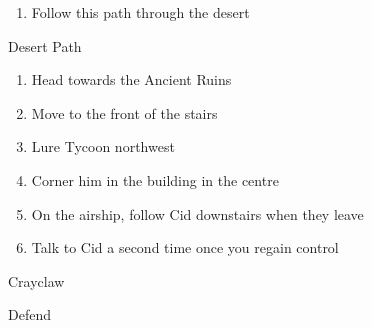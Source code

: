 \begin{paracol}{2}
\switchcolumnTwice[*]
\begin{enumerate}[resume]
    \item Follow this path through the desert
\end{enumerate}

\switchcolumn
\begin{misc}{Desert Path}
\end{misc}

\switchcolumn
\resume
\begin{enumerate}[resume]
    \item Head towards the Ancient Ruins
    \item Move to the front of the stairs
    \item Lure Tycoon northwest
    \item Corner him in the building in the centre
    \item On the airship, follow Cid downstairs when they leave
    \item Talk to Cid a second time once you regain control
\end{enumerate}

\begin{boss}{Crayclaw}
    \varwb
    \begin{round}{1}
        \faris \leftCommand{\throw} \then \thunderScroll
        \bartz Defend
        \lenna \leftCommand{\release}
    \end{round}
    \varwe
\end{boss}

\end{paracol}
\newpage
